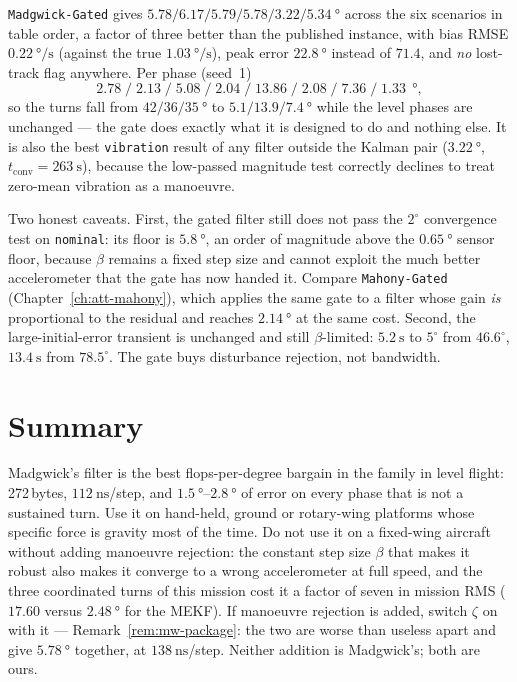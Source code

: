 \texttt{Madgwick-Gated} gives $5.78/6.17/5.79/5.78/3.22/\SI{5.34}{\degree}$ across the six scenarios
in table order, a factor of three better than the published instance, with bias RMSE
$\SI{0.22}{\degree\per\second}$ (against the true $\SI{1.03}{\degree\per\second}$), peak error
$\SI{22.8}{\degree}$ instead of $71.4$, and \emph{no} lost-track flag anywhere. Per phase (seed~1)
\[
2.78\;/\;2.13\;/\;5.08\;/\;2.04\;/\;13.86\;/\;2.08\;/\;7.36\;/\;1.33\ \SI{}{\degree},
\]
so the turns fall from $42/36/\SI{35}{\degree}$ to $5.1/13.9/\SI{7.4}{\degree}$ while the level
phases are unchanged --- the gate does exactly what it is designed to do and nothing else. It is
also the best \texttt{vibration} result of any filter outside the Kalman pair
($\SI{3.22}{\degree}$, $t_{\text{conv}}=\SI{263}{\second}$), because the low-passed magnitude test
correctly declines to treat zero-mean vibration as a manoeuvre.

Two honest caveats. First, the gated filter still does not pass the $2^\circ$ convergence test on
\texttt{nominal}: its floor is $\SI{5.8}{\degree}$, an order of magnitude above the
$\SI{0.65}{\degree}$ sensor floor, because $\beta$ remains a fixed step size and cannot exploit the
much better accelerometer that the gate has now handed it. Compare \texttt{Mahony-Gated}
(Chapter~\ref{ch:att-mahony}), which applies the same gate to a filter whose gain \emph{is}
proportional to the residual and reaches $\SI{2.14}{\degree}$ at the same cost. Second, the
large-initial-error transient is unchanged and still $\beta$-limited: $\SI{5.2}{\second}$ to
$5^\circ$ from $46.6^\circ$, $\SI{13.4}{\second}$ from $78.5^\circ$. The gate buys disturbance
rejection, not bandwidth.

\section{Summary}
Madgwick's filter is the best flops-per-degree bargain in the family in level flight: 272\,bytes,
$\SI{112}{\nano\second}$/step, and $\SI{1.5}{\degree}$--$\SI{2.8}{\degree}$ of error on every phase
that is not a sustained turn. Use it on hand-held, ground or rotary-wing platforms whose specific
force is gravity most of the time. Do not use it on a fixed-wing aircraft without adding manoeuvre
rejection: the constant step size $\beta$ that makes it robust also makes it converge to a wrong
accelerometer at full speed, and the three coordinated turns of this mission cost it a factor of
seven in mission RMS ($17.60$ versus $\SI{2.48}{\degree}$ for the MEKF). If manoeuvre rejection is
added, switch $\zeta$ on with it --- Remark~\ref{rem:mw-package}: the two are worse than useless
apart and give $\SI{5.78}{\degree}$ together, at $\SI{138}{\nano\second}$/step. Neither addition is
Madgwick's; both are ours.
